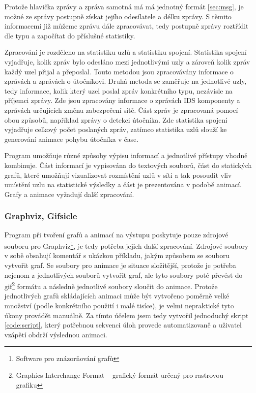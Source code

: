 \documentclass[11pt,final,twoside]{fithesis2}
\begin{document}
Protože hlavička zprávy a zpráva samotná má má jednotný formát \ref{sec:msg}, je možné ze správy postupně získat jejího odesílatele a délku zprávy. S těmito informacemi již můžeme zprávu dále zpracovávat, 
tedy postupně zprávy roztřídit dle typu a započítat do příslušné statistiky. 

Zpracování je rozděleno na statistiku uzlů a statistiku spojení. Statistika spojení vyjadřuje, kolik zpráv bylo odesláno mezi jednotlivými uzly a zároveň kolik zpráv každý uzel přijal a přeposlal. 
Touto metodou jsou zpracovávány informace o  zprávách a zprávách o útočníkovi. Druhá metoda se zaměřuje na jednotlivé uzly, tedy informace, kolik který uzel poslal zpráv konkrétního typu, 
nezávisle na příjemci zprávy. Zde jsou zpracovány informace o zprávách IDS komponenty a zprávách určujících změnu zabezpečení sítě. Část zpráv je zpracovaná pomocí obou způsobů, například zprávy o detekci
útočníka. Zde statistika spojení vyjadřuje celkový počet poslaných zpráv, zatímco statistika uzlů slouží ke generování animace pohybu útočníka v čase.

Program umožňuje různé způsoby výpisu informací a jednotlivé přístupy vhodně kombinuje. Část informací je vypisována do textových souborů, část do statických grafů, které umožňují vizualizovat 
rozmístění uzlů v síti a tak posoudit vliv umístění uzlu na statistické výsledky a část je prezentována v podobě animací. Grafy a animace vyžadují další zpracování.

\subsubsection{Graphviz, Gifsicle}

Program při tvoření grafů a animací na výstupu poskytuje pouze zdrojové souboru pro Graphviz\footnote{Software pro znázorňování grafů}, je tedy potřeba jejich další zpracování. Zdrojové soubory 
v sobě obsahují komentář s ukázkou příkladu, jakým způsobem se souboru vytvořit graf. Se soubory pro animace je situace složitější, protože je potřeba nejenom z jednotlivých souborů vytvořit graf, ale 
tyto soubory poté převést do gif\footnote{Graphics Interchange Format --  grafický formát určený pro rastrovou grafiku} formátu a následně jednotlivé soubory sloučit do animace. Protože jednotlivých
grafů skládajících animaci může být vytvořeno poměrně velké množství (podle konkrétního použití i malé tisíce), je velmi nepraktické tyto úkony provádět manuálně. Za tímto účelem jsem tedy vytvořil 
jednoduchý skript \ref{code:script}, který potřebnou sekvenci úloh provede automatizovaně a uživatel vzápětí obdrží výslednou animaci. 
\end{document}
